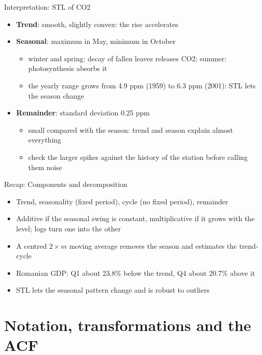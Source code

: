 \begin{frame}{Interpretation: STL of CO2}
\itemsize{\small}
\begin{itemize}
    \item \textbf{Trend}: smooth, slightly convex: the rise accelerates
    \item \textbf{Seasonal}: maximum in May, minimum in October
    \begin{itemize}
        \item winter and spring: decay of fallen leaves releases CO2; summer: photosynthesis absorbs it
        \item the yearly range grows from 4.9 ppm (1959) to 6.3 ppm (2001): STL lets the season change
    \end{itemize}
    \item \textbf{Remainder}: standard deviation 0.25 ppm
    \begin{itemize}
        \item small compared with the season: trend and season explain almost everything
        \item check the larger spikes against the history of the station before calling them noise
    \end{itemize}
\end{itemize}
\end{frame}

\begin{frame}{Recap: Components and decomposition}
\itemsize{\small}
\begin{itemize}
    \item Trend, seasonality (fixed period), cycle (no fixed period), remainder
    \item Additive if the seasonal swing is constant, multiplicative if it grows with the level; logs turn one into the other
    \item A centred $2 \times m$ moving average removes the season and estimates the trend-cycle
    \item Romanian GDP: Q1 about 23.8\% below the trend, Q4 about 20.7\% above it
    \item STL lets the seasonal pattern change and is robust to outliers
\end{itemize}
\end{frame}


\section{Notation, transformations and the ACF}

